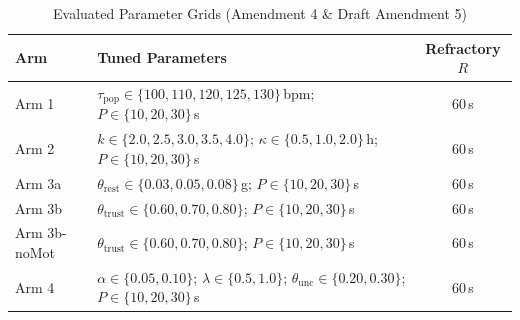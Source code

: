 \begin{table}[htbp]
\caption{Evaluated Parameter Grids (Amendment 4 \& Draft Amendment 5)}
\label{tab:parameter_grids}
\centering
\scriptsize
\begin{tabular}{|l|p{4.5cm}|c|}
\hline
\textbf{Arm} & \textbf{Tuned Parameters} & \textbf{Refractory $R$} \\
\hline
Arm 1 & \raggedright $\tau_{\text{pop}} \in \{100, 110, 120, 125, 130\}$\,bpm; $P \in \{10, 20, 30\}$\,s & 60\,s \\
\hline
Arm 2 & \raggedright $k \in \{2.0, 2.5, 3.0, 3.5, 4.0\}$; $\kappa \in \{0.5, 1.0, 2.0\}$\,h; $P \in \{10, 20, 30\}$\,s & 60\,s \\
\hline
Arm 3a & \raggedright $\theta_{\text{rest}} \in \{0.03, 0.05, 0.08\}$\,g; $P \in \{10, 20, 30\}$\,s & 60\,s \\
\hline
Arm 3b & \raggedright $\theta_{\text{trust}} \in \{0.60, 0.70, 0.80\}$; $P \in \{10, 20, 30\}$\,s & 60\,s \\
\hline
Arm 3b-noMot & \raggedright $\theta_{\text{trust}} \in \{0.60, 0.70, 0.80\}$; $P \in \{10, 20, 30\}$\,s & 60\,s \\
\hline
Arm 4 & \raggedright $\alpha \in \{0.05, 0.10\}$; $\lambda \in \{0.5, 1.0\}$; $\theta_{\text{unc}} \in \{0.20, 0.30\}$; $P \in \{10, 20, 30\}$\,s & 60\,s \\
\hline
\end{tabular}
\end{table}
